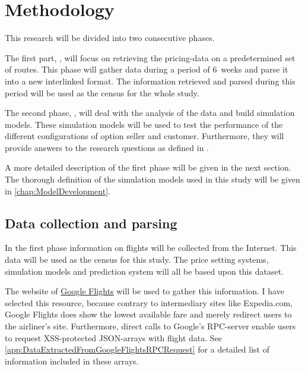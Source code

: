 \chapter{Methodology}
\label{chap:Methodology}
This research will be divided into two consecutive phases.

The first part, , will focus on retrieving the pricing-data on a predetermined set of routes. This phase will gather data during a period of 6~weeks and parse it into a new interlinked format. The information retrieved and parsed during this period will be used as the census for the whole study.

The second phase, , will deal with the analysis of the data and build simulation models. These simulation models will be used to test the performance of the different configurations of option seller and customer. Furthermore, they will provide answers to the research questions as defined in .

A more detailed description of the first phase will be given in the next section. The thorough definition of the simulation models used in this study will be given in \ref{chap:ModelDevelopment}.


\section{Data collection and parsing}
\label{subsec:DataCollectionAndParsing}
In the first phase information on flights will be collected from the Internet. This data will be used as the census for this study. The price setting systems, simulation models and prediction system will all be based upon this dataset.

The website of \href{http://google.nl/flights}{Google Flights} will be used to gather this information. I have selected this resource, because contrary to intermediary sites like Expedia.com, Google Flights does show the lowest available fare and merely redirect users to the airliner's site. Furthermore, direct calls to Google's RPC-server enable users to request XSS-protected JSON-arrays with flight data. See \autoref{app:DataExtractedFromGoogleFlightsRPCRequest} for a detailed list of information included in these arrays.

